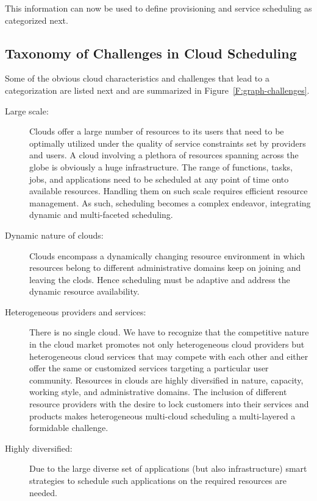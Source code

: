 \documentclass[final,5p,times,twocolumn]{elsarticle}
\begin{document}


This information can now be used to define provisioning and service scheduling as categorized next.

\subsection{Taxonomy of Challenges in Cloud Scheduling}\label{sec:challange}

Some of the obvious cloud characteristics and challenges that lead to a categorization are listed next and are summarized in Figure~\ref{F:graph-challenges}.

\begin{description}

\item [Large scale:] Clouds offer a large number of resources to its users that need to be optimally utilized under the quality of service constraints set by providers and users. A cloud involving a plethora of resources spanning across the globe is obviously a huge infrastructure. The range of functions, tasks, jobs, and applications need to be scheduled at any point of time onto available resources. Handling them on such scale requires efficient resource management. As such, scheduling becomes a complex endeavor, integrating dynamic and multi-faceted scheduling. 

\item [Dynamic nature of clouds:] Clouds encompass a dynamically changing resource environment in which resources belong to different administrative domains keep on joining and leaving the clods. Hence scheduling must be adaptive and address the dynamic resource availability.

\item[Heterogeneous providers and services:] There is no single cloud. We have to recognize that the competitive nature in the cloud market promotes not only heterogeneous cloud providers but heterogeneous cloud services that may compete with each other and either offer the same or customized services targeting a particular user community. Resources in clouds are highly diversified in nature, capacity, working style, and administrative domains. The inclusion of different resource providers with the desire to lock customers into their services and products makes heterogeneous multi-cloud scheduling a multi-layered a formidable challenge.

\item [Highly diversified:] Due to the large diverse set of applications (but also infrastructure) smart strategies to schedule such applications on the required resources are needed.


\end{description}
\end{document}
